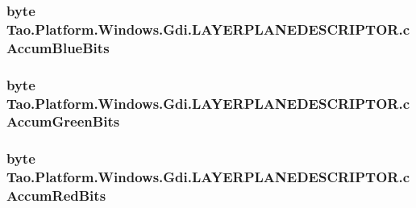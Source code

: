 \label{struct_tao_1_1_platform_1_1_windows_1_1_gdi_1_1_l_a_y_e_r_p_l_a_n_e_d_e_s_c_r_i_p_t_o_r_ae204a3c79dd4ed3045920fe62444fe58}
\hypertarget{struct_tao_1_1_platform_1_1_windows_1_1_gdi_1_1_l_a_y_e_r_p_l_a_n_e_d_e_s_c_r_i_p_t_o_r_affb07e3c1b7d4de8f4a0c7affe4c3476}{
\subsubsection[{cAccumBlueBits}]{\setlength{\rightskip}{0pt plus 5cm}byte {\bf Tao.Platform.Windows.Gdi.LAYERPLANEDESCRIPTOR.cAccumBlueBits}}}
\label{struct_tao_1_1_platform_1_1_windows_1_1_gdi_1_1_l_a_y_e_r_p_l_a_n_e_d_e_s_c_r_i_p_t_o_r_affb07e3c1b7d4de8f4a0c7affe4c3476}
\hypertarget{struct_tao_1_1_platform_1_1_windows_1_1_gdi_1_1_l_a_y_e_r_p_l_a_n_e_d_e_s_c_r_i_p_t_o_r_a3cd67d9f73e1235c97ac0b335624e816}{
\subsubsection[{cAccumGreenBits}]{\setlength{\rightskip}{0pt plus 5cm}byte {\bf Tao.Platform.Windows.Gdi.LAYERPLANEDESCRIPTOR.cAccumGreenBits}}}
\label{struct_tao_1_1_platform_1_1_windows_1_1_gdi_1_1_l_a_y_e_r_p_l_a_n_e_d_e_s_c_r_i_p_t_o_r_a3cd67d9f73e1235c97ac0b335624e816}
\hypertarget{struct_tao_1_1_platform_1_1_windows_1_1_gdi_1_1_l_a_y_e_r_p_l_a_n_e_d_e_s_c_r_i_p_t_o_r_a9856a34456af97f043fc27350421d357}{
\subsubsection[{cAccumRedBits}]{\setlength{\rightskip}{0pt plus 5cm}byte {\bf Tao.Platform.Windows.Gdi.LAYERPLANEDESCRIPTOR.cAccumRedBits}}}
\label{struct_tao_1_1_platform_1_1_windows_1_1_gdi_1_1_l_a_y_e_r_p_l_a_n_e_d_e_s_c_r_i_p_t_o_r_a9856a34456af97f043fc27350421d357}

